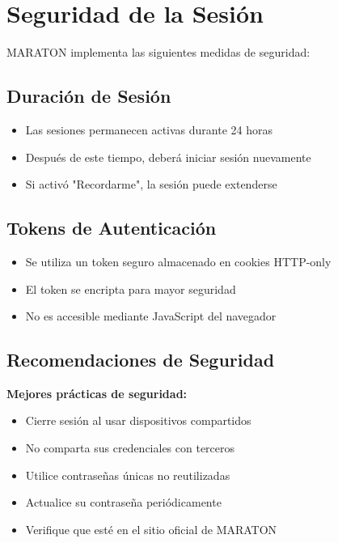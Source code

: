 \documentclass[11pt,a4paper,twoside]{book}
\begin{document}
\section{Seguridad de la Sesión}

MARATON implementa las siguientes medidas de seguridad:

\subsection{Duración de Sesión}
\begin{itemize}
    \item Las sesiones permanecen activas durante 24 horas
    \item Después de este tiempo, deberá iniciar sesión nuevamente
    \item Si activó "Recordarme", la sesión puede extenderse
\end{itemize}

\subsection{Tokens de Autenticación}
\begin{itemize}
    \item Se utiliza un token seguro almacenado en cookies HTTP-only
    \item El token se encripta para mayor seguridad
    \item No es accesible mediante JavaScript del navegador
\end{itemize}

\subsection{Recomendaciones de Seguridad}

\begin{notebox}
\textbf{Mejores prácticas de seguridad:}
\begin{itemize}
    \item Cierre sesión al usar dispositivos compartidos
    \item No comparta sus credenciales con terceros
    \item Utilice contraseñas únicas no reutilizadas
    \item Actualice su contraseña periódicamente
    \item Verifique que esté en el sitio oficial de MARATON
\end{itemize}
\end{notebox}
\end{document}
